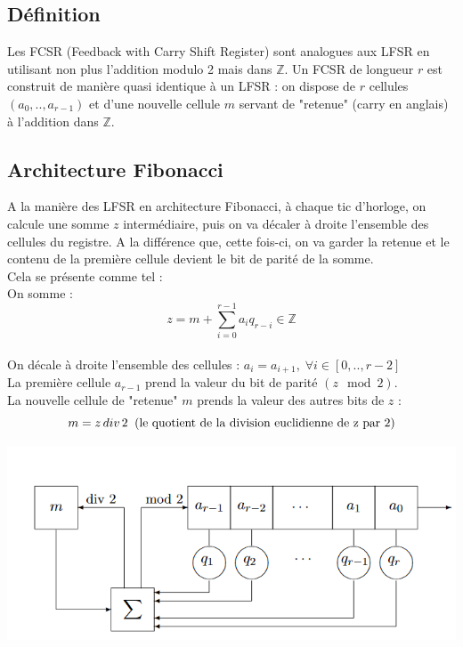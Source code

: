 \documentclass[11pt]{report}
\begin{document}
\subsection{Définition}
Les FCSR (Feedback with Carry Shift Register) sont analogues aux LFSR en utilisant non plus l'addition modulo 2 mais dans $\mathbb{Z}$.
Un FCSR de longueur $r$ est construit de manière quasi identique à un LFSR : on dispose de $r$ cellules $(a_0,..,a_{r-1})$ et d'une nouvelle cellule $m$ servant de "retenue" (carry en anglais) à l'addition dans $\mathbb{Z}$.

\subsection{Architecture Fibonacci}
A la manière des LFSR en architecture Fibonacci, à chaque tic d'horloge, on calcule une somme $z$ intermédiaire, puis on va décaler à droite l'ensemble des cellules du registre. A la différence que, cette fois-ci, on va garder la retenue et le contenu de la première cellule devient le bit de parité de la somme.  
\\
Cela se présente comme tel : 
\\
On somme : 
\[
z= m + \sum_{i=0}^{r-1} a_iq_{r-i} \in \mathbb{Z}
\]
\\
On décale à droite l'ensemble des cellules : 
$a_i = a_{i+1},\; \forall i \in [0,..,r-2]$
\\
La première cellule $a_{r-1}$ prend la valeur du bit de parité $(z \mod 2)$. 
\\
La nouvelle cellule de "retenue" $m$ prends la valeur des autres bits de $z$ : 
\[
 	m = z\, div \, 2 \;\; \textnormal{(le quotient de la division euclidienne de z par 2)}
\]

\begin{center}
	
	\includegraphics[scale=0.7]{FiboFCSR.png}
	\label{FCSRFibo}

\end{center}
\end{document}
